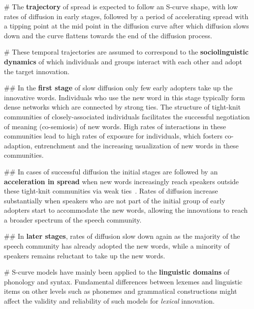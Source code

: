 \documentclass[
  a4paper,
  abstract=on,
  captions=tableabove
  ]{scrartcl}
\renewcommand{\hw}[1]{\textbf{#1}}
\begin{document}
  \begin{easylist}[itemize]

  # The \hw{trajectory} of spread is expected to follow an S-curve shape, with low rates of diffusion in early stages, followed by a period of accelerating spread with a tipping point at the mid point in the diffusion curve after which diffusion slows down and the curve flattens towards the end of the diffusion process.

  # These temporal trajectories are assumed to correspond to the \hw{sociolinguistic dynamics} of which individuals and groups interact with each other and adopt the target innovation.

  ## In the \hw{first stage} of slow diffusion only few early adopters take up the innovative words. Individuals who use the new word in this stage typically form dense networks which are connected by strong ties. The structure of tight-knit communities of closely-associated individuals facilitates the successful negotiation of meaning (co-semiosis) of new words. High rates of interactions in these communities lead to high rates of exposure for individuals, which fosters co-adaption, entrenchment and the increasing usualization of new words in these communities.

  ## In cases of successful diffusion the initial stages are followed by an \hw{acceleration in spread} when new words increasingly reach speakers outside these tight-knit communities via weak ties~\parencite{Granovetter1977StrengthWeak}. Rates of diffusion increase substantially when speakers who are not part of the initial group of early adopters start to accommodate the new words, allowing the innovations to reach a broader spectrum of the speech community.

  ## In \hw{later stages}, rates of diffusion slow down again as the majority of the speech community has already adopted the new words, while a minority of speakers remains reluctant to take up the new words.

  # S-curve models have mainly been applied to the \hw{linguistic domains} of phonology and syntax. Fundamental differences between lexemes and linguistic items on other levels such as phonemes and grammatical constructions might affect the validity and reliability of such models for \emph{lexical} innovation.


\end{easylist}
\end{document}
